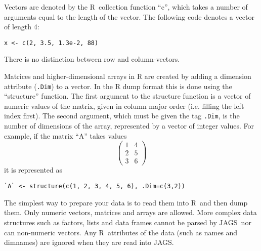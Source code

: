 \documentclass[11pt, a4paper, titlepage]{report}
\newcommand{\JAGS}{\textsf{JAGS}}
\newcommand{\R}{\textsf{R}}
\begin{document}
Vectors are denoted by the \R\ collection function ``c'', which takes
a number of arguments equal to the length of the vector.  The
following code denotes a vector of length 4:
\begin{verbatim}
x <- c(2, 3.5, 1.3e-2, 88)
\end{verbatim}
There is no distinction between row and column-vectors. 

Matrices and higher-dimensional arrays in R are created by adding a
dimension attribute (\verb+.Dim+) to a vector. In the R dump format
this is done using the ``structure'' function.  The first argument to
the structure function is a vector of numeric values of the matrix,
given in column major order (i.e. filling the left index first). The
second argument, which must be given the tag \verb+.Dim+, is the
number of dimensions of the array, represented by a vector of integer
values. For example, if the matrix ``A'' takes values
\[
\left(
\begin{array}{cc}
  1 & 4 \\
  2 & 5 \\
  3 & 6 
\end{array}
\right)
\]
it is represented as
\begin{verbatim}
`A` <- structure(c(1, 2, 3, 4, 5, 6), .Dim=c(3,2))
\end{verbatim}

The simplest way to prepare your data is to read them into \R\ and
then dump them.  Only numeric vectors, matrices and arrays are
allowed. More complex data structures such as factors, lists and data
frames cannot be parsed by \JAGS\, nor can non-numeric vectors.  Any
\R\ attributes of the data (such as names and dimnames) are ignored
when they are read into \JAGS. 



\end{document}
